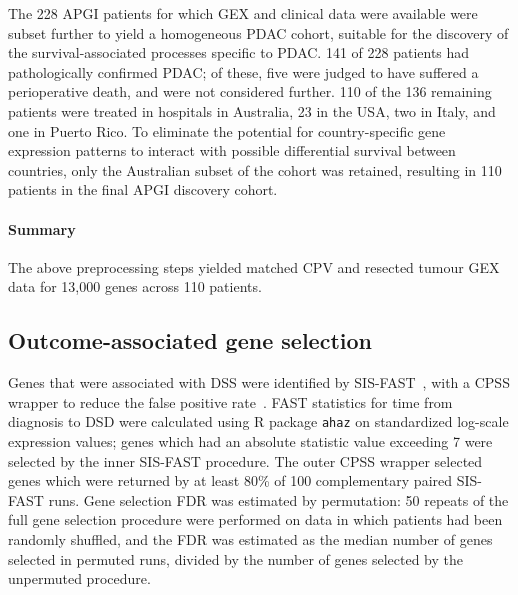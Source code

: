 \documentclass[dissertation.tex]{subfiles}
\begin{document}
The 228 \gls{APGI} patients for which \gls{GEX} and clinical data were available were subset further to yield a homogeneous \gls{PDAC} cohort, suitable for the discovery of the survival-associated processes specific to \gls{PDAC}.  141 of 228 patients had pathologically confirmed \gls{PDAC}; of these, five were judged to have suffered a perioperative death, and were not considered further.  110 of the 136 remaining patients were treated in hospitals in Australia, 23 in the USA, two in Italy, and one in Puerto Rico.  To eliminate the potential for country-specific gene expression patterns to interact with possible differential survival between countries, only the Australian subset of the cohort was retained, resulting in 110 patients in the final \gls{APGI} discovery cohort.

\paragraph{Summary}
The above preprocessing steps yielded matched \gls{CPV} and resected tumour \gls{GEX} data for 13,000 genes across 110 patients.

\subsection{Outcome-associated gene selection}
Genes that were associated with \gls{DSS} were identified by \gls{SIS}-\gls{FAST}~\cite{Gorst-Rasmussen2013}, with a \gls{CPSS} wrapper to reduce the false positive rate~\cite{Shah2013}.  \gls{FAST} statistics for time from diagnosis to \gls{DSD} were calculated using R package \texttt{ahaz} on standardized log-scale expression values; genes which had an absolute statistic value exceeding 7 were selected by the inner \gls{SIS}-\gls{FAST} procedure.  The outer \gls{CPSS} wrapper selected genes which were returned by at least 80\% of 100 complementary paired \gls{SIS}-\gls{FAST} runs.  Gene selection \gls{FDR} was estimated by permutation: 50 repeats of the full gene selection procedure were performed on data in which patients had been randomly shuffled, and the \gls{FDR} was estimated as the median number of genes selected in permuted runs, divided by the number of genes selected by the unpermuted procedure.
\end{document}
